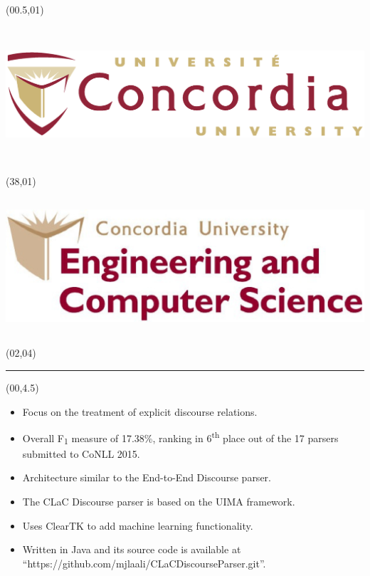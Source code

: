 \documentclass{article}
\def\CHead#1{\begin{center}\noindent{\LARGE\color{DarkBlue} #1}\end{center}}
\renewcommand{\LARGE}{\fontsize{43}{54}\selectfont}
\begin{document}
\begin{textblock}{8}(00.5,01)
\begin{center}
\includegraphics[height=5cm]{concordia.eps}
\end{center}
\end{textblock}

\begin{textblock}{8}(38,01)
\begin{center}
\includegraphics[height=5cm]{encs.eps}
\end{center}
\end{textblock}


\begin{textblock}{42}(02,04)
\begin{center}
\rule{1200pt}{7pt}
\end{center}
\end{textblock}



\begin{textblock}{10}(00,4.5)
\CHead{I. Summary}            %
\begin{itemize}
\item Focus on the treatment of explicit discourse relations.
\item Overall F\textsubscript{1} measure of 17.38\%, ranking in 6\textsuperscript{th} place out of the 17 parsers submitted to CoNLL 2015.
\item Architecture similar to the End-to-End Discourse parser. %
\item The CLaC Discourse parser is based on the UIMA framework. %
\item Uses ClearTK to add machine learning functionality.
\item Written in Java and its source code is available at \\ ``https://github.com/mjlaali/CLaCDiscourseParser.git''.
\end{itemize}
\nocite{lin14}
\nocite{ferrucci04}
\nocite{bethard14}
\nocite{kong14}
\end{textblock}
\end{document}
